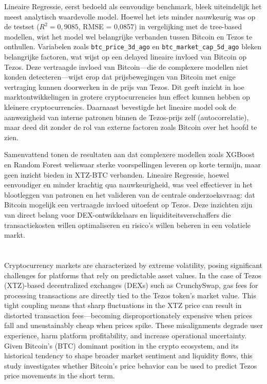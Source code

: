 Lineaire Regressie, eerst bedoeld als eenvoudige benchmark, bleek uiteindelijk het meest analytisch waardevolle model. Hoewel het iets minder nauwkeurig was op de testset ($R^2 = 0{,}9085$, RMSE = 0{,}0857) in vergelijking met de tree-based modellen, wist het model wel belangrijke verbanden tussen Bitcoin en Tezos te onthullen. Variabelen zoals \texttt{btc\_price\_3d\_ago} en \texttt{btc\_market\_cap\_5d\_ago} bleken belangrijke factoren, wat wijst op een delayed lineaire invloed van Bitcoin op Tezos. Deze vertraagde invloed van Bitcoin—die de complexere modellen niet konden detecteren—wijst erop dat prijsbewegingen van Bitcoin met enige vertraging kunnen doorwerken in de prijs van Tezos. Dit geeft inzicht in hoe marktontwikkelingen in grotere cryptocurrencies hun effect kunnen hebben op kleinere cryptocurrencies. Daarnaast bevestigde het lineaire model ook de aanwezigheid van interne patronen binnen de Tezos-prijs zelf (autocorrelatie), maar deed dit zonder de rol van externe factoren zoals Bitcoin over het hoofd te zien.

Samenvattend tonen de resultaten aan dat complexere modellen zoals XGBoost en Random Forest weliswaar sterke voorspellingen leveren op korte termijn, maar geen inzicht bieden in XTZ-BTC verbanden. Lineaire Regressie, hoewel eenvoudiger en minder krachtig qua nauwkeurigheid, was veel effectiever in het blootleggen van patronen en het valideren van de centrale onderzoeksvraag: dat Bitcoin mogelijk een vertraagde invloed uitoefent op Tezos. Deze inzichten zijn van direct belang voor DEX-ontwikkelaars en liquiditeitsverschaffers die transactiekosten willen optimaliseren en risico’s willen beheren in een volatiele markt.

\chapter*{}


Cryptocurrency markets are characterized by extreme volatility, posing significant challenges for platforms that rely on predictable asset values. 
In the case of Tezos (XTZ)-based decentralized exchanges (DEXs) such as CrunchySwap, gas fees for processing transactions are directly tied to the Tezos token’s market value. 
This tight coupling means that sharp fluctuations in the XTZ price can result in distorted transaction fees—becoming disproportionately expensive when prices fall and unsustainably cheap when prices spike. 
These misalignments degrade user experience, harm platform profitability, and increase operational uncertainty. 
Given Bitcoin’s (BTC) dominant position in the crypto ecosystem, and its historical tendency to shape broader market sentiment and liquidity flows, this study investigates whether Bitcoin’s price behavior can be used to predict Tezos price movements in the short term.

